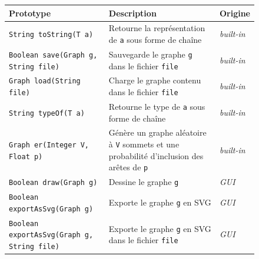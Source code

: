\documentclass[french]{article}
\begin{document}
			\begin{figure}[H]
				\centering
				\begin{longtable}{p{0.45\textwidth}p{}p{}}
					Prototype & Description & Origine\\
					\hline
					\texttt{String toString(T a)} & Retourne la représentation de \texttt{a} sous forme de chaîne & \textit{built-in}\\
					\texttt{Boolean save(Graph g, String file)} & Sauvegarde le graphe \texttt{g} dans le fichier \texttt{file} & \textit{built-in}\\
					\texttt{Graph load(String file)} & Charge le graphe contenu dans le fichier \texttt{file} & \textit{built-in}\\
					\texttt{String typeOf(T a)} & Retourne le type de \texttt{a} sous forme de chaîne & \textit{built-in}\\
					\texttt{Graph er(Integer V, Float p)} & Génère un graphe aléatoire à \texttt{V} sommets et une probabilité d'inclusion des arêtes de \texttt{p} & \textit{built-in} \\
					
					\texttt{Boolean draw(Graph g)} & Dessine le graphe \texttt{g} & \textit{GUI}\\
					\texttt{Boolean exportAsSvg(Graph g)} & Exporte le graphe \texttt{g} en SVG & \textit{GUI}\\
					\texttt{Boolean exportAsSvg(Graph g, String file)} & Exporte le graphe \texttt{g} en SVG dans le fichier \texttt{file} & \textit{GUI}\\
					

\end{longtable}
\end{figure}
\end{document}
